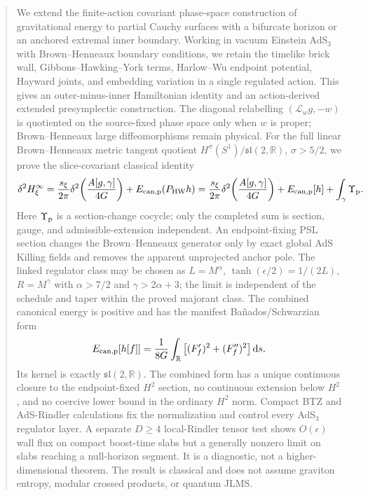 \begin{abstract}

We extend the finite-action covariant phase-space construction of gravitational energy to partial Cauchy surfaces with a bifurcate horizon or an anchored extremal inner boundary.  Working in vacuum Einstein AdS$_3$ with Brown--Henneaux boundary conditions, we retain the timelike brick wall, Gibbons--Hawking--York terms, Harlow--Wu endpoint potential, Hayward joints, and embedding variation in a single regulated action.  This gives an outer-minus-inner Hamiltonian identity and an action-derived extended presymplectic construction.  The diagonal relabelling $(\mathcal L_wg,-w)$ is quotiented on the source-fixed phase space only when $w$ is proper; Brown--Henneaux large diffeomorphisms remain physical.  For the full linear Brown--Henneaux metric tangent quotient $H^\sigma(S^1)/\mathfrak{sl}(2,\mathbb R)$, $\sigma>5/2$, we prove the slice-covariant classical identity
\[
\delta^2H_\xi^\infty
=\frac{s_\xi}{2\pi}\delta^2\!\left(\frac{A[g,\gamma]}{4G}\right)
+E_{{\rm can,p}}(P_{\rm HW}h)
=\frac{s_\xi}{2\pi}\delta^2\!\left(\frac{A[g,\gamma]}{4G}\right)
+E_{{\rm can,p}}[h]+\int_\gamma\Upsilon_{\rm p}.
\]
Here $\Upsilon_{\rm p}$ is a section-change cocycle; only the completed sum is section, gauge, and admissible-extension independent.  An endpoint-fixing PSL section changes the Brown--Henneaux generator only by exact global AdS Killing fields and removes the apparent unprojected anchor pole.  The linked regulator class may be chosen as $L=M^\alpha$, $\tanh(\epsilon/2)=1/(2L)$, $R=M^\gamma$ with $\alpha>7/2$ and $\gamma>2\alpha+3$; the limit is independent of the schedule and taper within the proved majorant class.  The combined canonical energy is positive and has the manifest Bañados/Schwarzian form
\[
E_{{\rm can,p}}[h[f]]
=\frac1{8G}\int_{\mathbb R}
\big[(F_f')^2+(F_f'')^2\big]\,\mathrm ds .
\]
Its kernel is exactly $\mathfrak{sl}(2,\mathbb R)$.  The combined form has a unique continuous closure to the endpoint-fixed $H^2$ section, no continuous extension below $H^2$, and no coercive lower bound in the ordinary $H^2$ norm.  Compact BTZ and AdS-Rindler calculations fix the normalization and control every AdS$_3$ regulator layer.  A separate $D\geq4$ local-Rindler tensor test shows $O(\epsilon)$ wall flux on compact boost-time slabs but a generally nonzero limit on slabs reaching a null-horizon segment.  It is a diagnostic, not a higher-dimensional theorem.  The result is classical and does not assume graviton entropy, modular crossed products, or quantum JLMS.

\end{abstract}

\newpage
